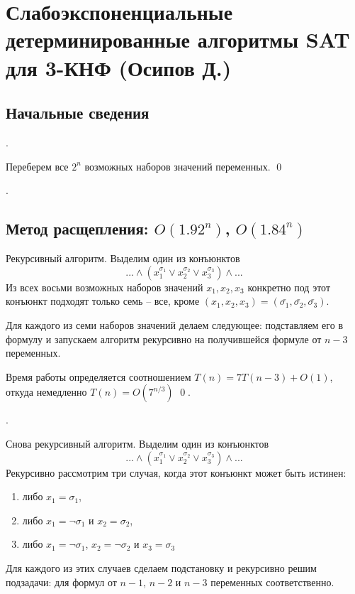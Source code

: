 \hypertarget{3sat}{}
\section{Слабоэкспоненциальные детерминированные алгоритмы SAT для 3-КНФ (Осипов Д.)}
\subsection{Начальные сведения}
.

 Переберем все $2^n$ возможных наборов значений переменных. \qed


.


\subsection{Метод расщепления: $O(1.92^n)$, $O(1.84^n)$}

Рекурсивный алгоритм. Выделим один из конъюнктов $$...\land(x_1^{\sigma_1} \lor x_2^{\sigma_2} \lor x_3^{\sigma_3})\land...$$ Из всех восьми возможных наборов значений $x_1, x_2, x_3$ конкретно под этот конъюнкт подходят только семь -- все, кроме $(x_1, x_2, x_3) = (\bar{\sigma_1}, \bar{\sigma_2}, \bar{\sigma_3})$. 

Для каждого из семи наборов значений делаем следующее: подставляем его в формулу и запускаем алгоритм рекурсивно на получившейся формуле от $n-3$ переменных.

Время работы определяется соотношением $T(n) = 7T(n-3) + O(1)$, откуда немедленно $T(n) = O(7^{n/3})$ \qed.

\needpicture

. 

Снова рекурсивный алгоритм. Выделим один из конъюнктов $$...\land(x_1^{\sigma_1} \lor x_2^{\sigma_2} \lor x_3^{\sigma_3})\land...$$ Рекурсивно рассмотрим три случая, когда этот конъюнкт может быть истинен:
\begin{enumerate}
\item либо $x_1 = \sigma_1$,
\item либо $x_1 = \neg\sigma_1$ и $x_2 = \sigma_2$,
\item либо $x_1 = \neg\sigma_1$, $x_2 = \neg\sigma_2$ и $x_3 = \sigma_3$
\end{enumerate}
Для каждого из этих случаев сделаем подстановку и рекурсивно решим подзадачи: для формул от $n-1$, $n-2$ и $n-3$ переменных соответственно. 

